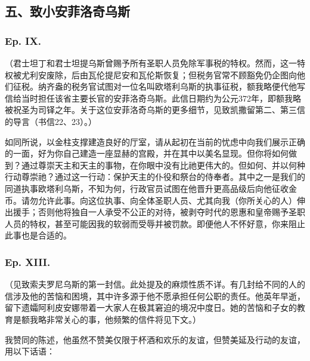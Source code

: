 
\subsection{五、致小安菲洛奇乌斯}


\subsubsection{Ep. IX.}

（君士坦丁和君士坦提乌斯曾赐予所有圣职人员免除军事税的特权。然而，这一特权被尤利安废除，后由瓦伦提尼安和瓦伦斯恢复；但税务官常不顾豁免仍企图向他们征税。纳齐盎的税务官试图对一位名叫欧塔利乌斯的执事征税，额我略便代他写信给当时担任该省主要长官的安菲洛奇乌斯。此信日期约为公元372年，即额我略被祝圣为司铎之年。关于这位安菲洛奇乌斯的更多细节，见致凯撒留第二、第三信的导言（书信22、23）。）\par

如同所说，以金柱支撑建造良好的厅室，请从起初在当前的忧虑中向我们展示正确的一面，好为你自己建造一座显赫的宫殿，并在其中以美名显现。但你将如何做到？通过尊崇天主和天主的事物，在你眼中没有比祂更伟大的。但如何、并以何种行动尊崇祂？通过这一行动：保护天主的仆役和祭台的侍奉者。其中之一是我们的同道执事欧塔利乌斯，不知为何，行政官员试图在他晋升更高品级后向他征收金币。请勿允许此事。向这位执事、向全体圣职人员、尤其向我（你所关心的人）伸出援手；否则他将独自一人承受不公正的对待，被剥夺时代的恩惠和皇帝赐予圣职人员的特权，甚至可能因我的软弱而受辱并被罚款。即便他人不怀好意，你来阻止此事也是合适的。\par


\subsubsection{Ep. XIII.}

（见致索夫罗尼乌斯的第一封信。此处提及的麻烦性质不详。有几封给不同的人的信涉及他的苦恼和困境，其中许多源于他不愿承担任何公职的责任。他英年早逝，留下遗孀阿利皮安娜带着一大家人在极其窘迫的境况中度日。她的苦恼和子女的教育是额我略非常关心的事，他频繁的信件将见下文。）\par

我赞同的陈述，他虽然不赞美仅限于杯酒和欢乐的友谊，但赞美延及行动的友谊，用以下话语：\par

